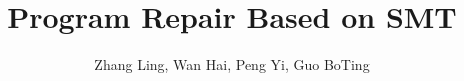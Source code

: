 \documentclass[preprint]{elsarticle}
\theoremstyle{definition}
\begin{document}
\title{Program Repair Based on SMT}
\author{Zhang Ling, Wan Hai, Peng Yi, Guo BoTing}
\address{School of Data Science and Computer, Sun Yat-sen University, Guangzhou, China}




\newpage

\newpage

\newpage

\newpage

\newpage

\newpage
{}

\end{document}

